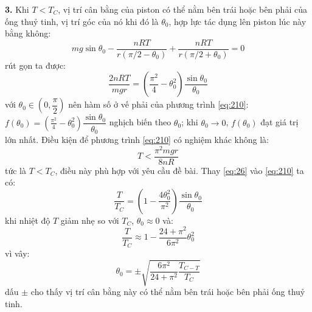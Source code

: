 \noindent\textbf{3.} Khi $T<T_{C}$, vị trí cân bằng của piston có thể nằm bên trái hoặc bên phải của ống thuỷ tinh, vị trí góc của nó khi đó là $\theta_{0}$, hợp lực tác dụng lên piston lúc này bằng không:
\begin{equation}
  \label{eq:29}
  mg\sin\theta_{0}-\frac{nRT}{r(\pi/2-\theta_{0})}+\frac{nRT}{r(\pi/2+\theta_{0})}=0
\end{equation}
rút gọn ta được:
\begin{equation}
  \label{eq:210}
  \frac{2nRT}{mgr}=\left(\frac{\pi^{2}}{4}-\theta_{0}^{2}\right)\frac{\sin\theta_{0}}{\theta_{0}}
\end{equation}
với $\theta_{0}\in\left(0,\dfrac{\pi}{2}\right)$ nên hàm số ở vế phải của phương trình \eqref{eq:210}: $f(\theta_{0})=\left(\frac{\pi^{2}}{4}-\theta_{0}^{2}\right)\dfrac{\sin\theta_{0}}{\theta_{0}}$ nghịch biến theo $\theta_{0}$; khi $\theta_{0}\rightarrow 0$, $f(\theta_{0})$ đạt giá trị lớn nhất. Điều kiện để phương trình \eqref{eq:210} có nghiệm khác không là:
\begin{equation*}
  T<\frac{\pi^{2}mgr}{8nR}
\end{equation*}
tức là $T<T_{C}$, điều này phù hợp với yêu cầu đề bài. Thay \eqref{eq:26} vào \eqref{eq:210} ta có:
\begin{equation}
  \label{eq:211}
  \frac{T}{T_{C}}=\left(1-\frac{4\theta_{0}^{2}}{\pi^{2}}\right)\frac{\sin\theta_{0}}{\theta_{0}}
\end{equation}
khi nhiệt độ $T$ giảm nhẹ so với $T_{C}$, $\theta_{0}\approx 0$ và:
\begin{equation}
  \label{eq:212}
  \frac{T}{T_{C}}\approx 1-\frac{24+\pi^{2}}{6\pi^{2}}\theta_{0}^{2}
\end{equation}
vì vây:
\begin{equation}
  \label{eq:213}
  \theta_{0}=\pm \sqrt{\frac{6\pi^{2}}{24+\pi^{2}}\frac{T_{{C}-T}}{T_{{C}}}}
\end{equation}
dấu $\pm$ cho thấy vị trí cân bằng này có thể nằm bên trái hoặc bên phải ống thuỷ tinh.\\

